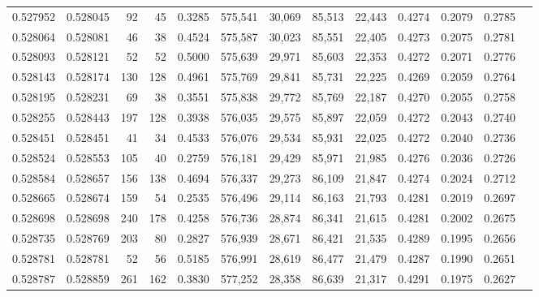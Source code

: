 \begin{tabular}{rrrrrrrrrrrrr}
0.527952 & 0.528045 &    92 &    45 &                                     0.3285 & 575,541 &  30,069 &  85,513 &  22,443 & 0.4274 & 0.2079 & 0.2785 \\
0.528064 & 0.528081 &    46 &    38 &                                     0.4524 & 575,587 &  30,023 &  85,551 &  22,405 & 0.4273 & 0.2075 & 0.2781 \\
0.528093 & 0.528121 &    52 &    52 &                                     0.5000 & 575,639 &  29,971 &  85,603 &  22,353 & 0.4272 & 0.2071 & 0.2776 \\
0.528143 & 0.528174 &   130 &   128 &                                     0.4961 & 575,769 &  29,841 &  85,731 &  22,225 & 0.4269 & 0.2059 & 0.2764 \\
0.528195 & 0.528231 &    69 &    38 &                                     0.3551 & 575,838 &  29,772 &  85,769 &  22,187 & 0.4270 & 0.2055 & 0.2758 \\
0.528255 & 0.528443 &   197 &   128 &                                     0.3938 & 576,035 &  29,575 &  85,897 &  22,059 & 0.4272 & 0.2043 & 0.2740 \\
0.528451 & 0.528451 &    41 &    34 &                                     0.4533 & 576,076 &  29,534 &  85,931 &  22,025 & 0.4272 & 0.2040 & 0.2736 \\
0.528524 & 0.528553 &   105 &    40 &                                     0.2759 & 576,181 &  29,429 &  85,971 &  21,985 & 0.4276 & 0.2036 & 0.2726 \\
0.528584 & 0.528657 &   156 &   138 &                                     0.4694 & 576,337 &  29,273 &  86,109 &  21,847 & 0.4274 & 0.2024 & 0.2712 \\
0.528665 & 0.528674 &   159 &    54 &                                     0.2535 & 576,496 &  29,114 &  86,163 &  21,793 & 0.4281 & 0.2019 & 0.2697 \\
0.528698 & 0.528698 &   240 &   178 &                                     0.4258 & 576,736 &  28,874 &  86,341 &  21,615 & 0.4281 & 0.2002 & 0.2675 \\
0.528735 & 0.528769 &   203 &    80 &                                     0.2827 & 576,939 &  28,671 &  86,421 &  21,535 & 0.4289 & 0.1995 & 0.2656 \\
0.528781 & 0.528781 &    52 &    56 &                                     0.5185 & 576,991 &  28,619 &  86,477 &  21,479 & 0.4287 & 0.1990 & 0.2651 \\
0.528787 & 0.528859 &   261 &   162 &                                     0.3830 & 577,252 &  28,358 &  86,639 &  21,317 & 0.4291 & 0.1975 & 0.2627 \\

\end{tabular}
